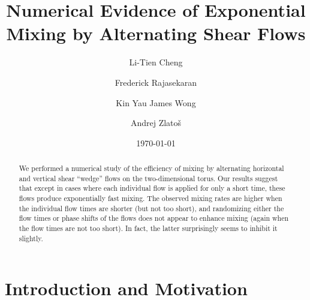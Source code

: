 \documentclass[12pt]{article}
\numberwithin{figure}{section}
\numberwithin{equation}{section}
\begin{document}
\title{Numerical Evidence of Exponential Mixing by Alternating Shear Flows}

\author{Li-Tien Cheng
\and
Frederick Rajasekaran
\and
Kin Yau James Wong
\and
Andrej Zlato\v s
\date{\today}
}

\newcommand{\Addresses}{{%
  \bigskip
  \footnotesize

  \textsc{Department of Mathematics, UC San Diego, La Jolla, CA 92093, USA}\par\nopagebreak
  \textit{E-mail:} \texttt{l3cheng@ucsd.edu, zlatos@ucsd.edu}

  \medskip

  \textsc{UC San Diego, La Jolla, CA 92093, USA}\par\nopagebreak
  \textit{E-mail:} \texttt{frajasek@ucsd.edu, k1wong@ucsd.edu}
}}

%


\maketitle

\begin{abstract}
We performed a numerical study of the efficiency of mixing by alternating horizontal and vertical shear ``wedge'' flows on the two-dimensional torus.  Our results suggest that except in cases where each individual flow is applied for only a short time, these flows produce exponentially fast mixing.  The observed mixing rates are higher when the individual flow times are shorter (but not too short), and randomizing either the flow times or phase shifts of the flows does not appear to enhance mixing (again when the flow times are not too short).  In fact, the latter surprisingly seems to inhibit it slightly.
\end{abstract}



\section{Introduction and Motivation}
\end{document}
